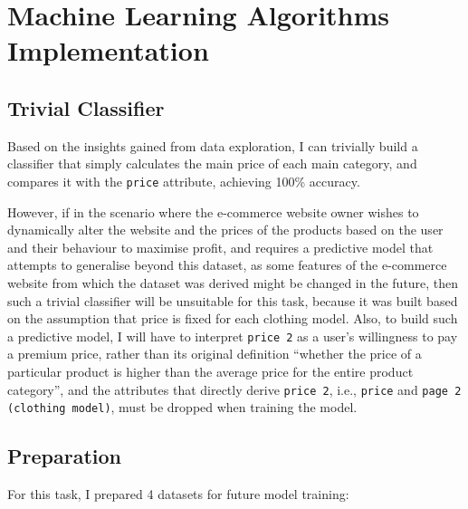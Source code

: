 \documentclass[12pt,twoside,a4paper]{article}
\begin{document}
\section{Machine Learning Algorithms Implementation}

\subsection{Trivial Classifier}

Based on the insights gained from data exploration, I can trivially build a classifier that simply calculates the main price of each main category, and compares it with the \texttt{price} attribute, achieving 100\% accuracy. 

However, if in the scenario where the e-commerce website owner wishes to dynamically alter the website and the prices of the products based on the user and their behaviour to maximise profit, and requires a predictive model that attempts to generalise beyond this dataset, as some features of the e-commerce website from which the dataset was derived might be changed in the future, then such a trivial classifier will be unsuitable for this task, because it was built based on the assumption that price is fixed for each clothing model. Also, to build such a predictive model, I will have to interpret \texttt{price 2} as a user's willingness to pay a premium price, rather than its original definition ``whether the price of a particular product is higher than the average price for the entire product category'', and the attributes that directly derive \texttt{price 2}, i.e., \texttt{price} and \texttt{page 2 (clothing model)}, must be dropped when training the model.

\newpage
\subsection{Preparation}

For this task, I prepared 4 datasets for future model training:
\end{document}

